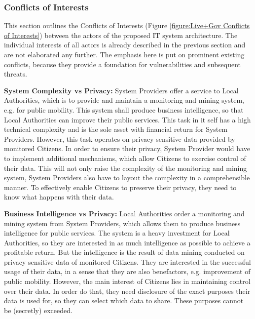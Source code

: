 \subsubsection{Conflicts of Interests}
\label{subsubsection:Conflicts of Interests}
This section outlines the Conflicts of Interests (Figure \ref{figure:Live+Gov Conflicts of Interests}) between the actors of the proposed IT system architecture. 
The individual interests of all actors is already described in the previous section and are not elaborated any further.
The emphasis here is put on prominent existing conflicts, because they provide a foundation for vulnerabilities and subsequent threats.




\textbf{System Complexity vs Privacy:}
System Providers offer a service to Local Authorities, which is to provide and maintain a monitoring and mining system, e.g. for public mobility.
This system shall produce business intelligence, so that Local Authorities can improve their public services.
This task in it self has a high technical complexity and is the sole asset with financial return for System Providers.
However, this task operates on privacy sensitive data provided by monitored Citizens.
In order to ensure their privacy, System Provider would have to implement additional mechanisms, which allow Citizens to exercise control of their data.
This will not only raise the complexity of the monitoring and mining system, System Providers also have to layout the complexity in a comprehensible manner.
To effectively enable Citizens to preserve their privacy, they need to know what happens with their data.


\textbf{Business Intelligence vs Privacy:}
Local Authorities order a monitoring and mining system from System Providers, which allows them to produce business intelligence for public services.
The system is a heavy investment for Local Authorities, so they are interested in as much intelligence as possible to achieve a profitable return.
But the intelligence is the result of data mining conducted on privacy sensitive data of monitored Citizens.
They are interested in the successful usage of their data, in a sense that they are also benefactors, e.g. improvement of public mobility.
However, the main interest of Citizens lies in maintaining control over their data.
In order do that, they need disclosure of the exact purposes their data is used for, so they can select which data to share.
These purposes cannot be (secretly) exceeded.


